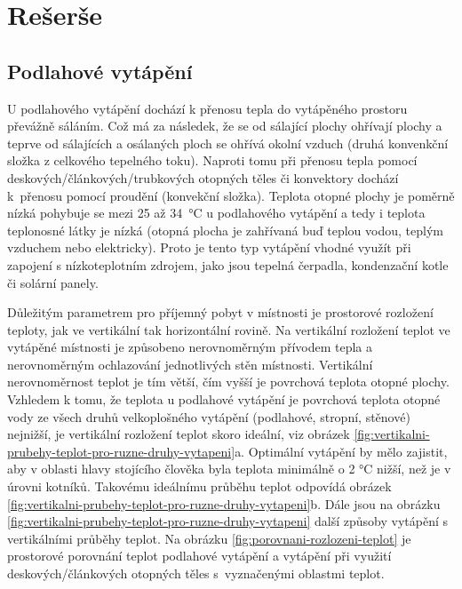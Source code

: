 

\chapter{Rešerše}


\section{Podlahové vytápění}

U podlahového vytápění dochází k přenosu tepla do vytápěného prostoru převážně sáláním. Což má za následek, že se od sálající plochy ohřívají plochy a teprve od sálajících a osálaných ploch se ohřívá okolní vzduch (druhá konvenkční složka z celkového tepelného toku). Naproti tomu při přenosu tepla pomocí deskových/článkových/trubkových otopných těles či konvektory dochází k~přenosu pomocí proudění (konvekční složka). Teplota otopné plochy je poměrně nízká pohybuje se mezi 25 až 34~°C u podlahového vytápění a tedy i teplota teplonosné látky je nízká (otopná plocha je zahřívaná buď teplou vodou, teplým vzduchem nebo elektricky). Proto je tento typ vytápění vhodné využít při zapojení s nízkoteplotním zdrojem, jako jsou tepelná čerpadla, kondenzační kotle či solární panely. \cite{basta-velkoplosne-vytapeni} \cite{valter-regulace-v-praxi}

Důležitým parametrem pro příjemný pobyt v místnosti je prostorové rozložení teploty, jak ve vertikální tak horizontální rovině. Na vertikální rozložení teplot ve vytápěné místnosti je způsobeno nerovnoměrným přívodem tepla a nerovnoměrným ochlazování jednotlivých stěn místnosti. Vertikální nerovnoměrnost teplot je tím větší, čím vyšší je povrchová teplota otopné plochy. Vzhledem k tomu, že teplota u podlahové vytápění je povrchová teplota otopné vody ze všech druhů velkoplošného vytápění (podlahové, stropní, stěnové) nejnižší, je vertikální rozložení teplot skoro ideální, viz obrázek \ref{fig:vertikalni-prubehy-teplot-pro-ruzne-druhy-vytapeni}a. Optimální vytápění by mělo zajistit, aby v oblasti hlavy stojícího člověka byla teplota minimálně o 2 °C nižší, než je v úrovni kotníků. Takovému ideálnímu průběhu teplot odpovídá obrázek \ref{fig:vertikalni-prubehy-teplot-pro-ruzne-druhy-vytapeni}b. Dále jsou na obrázku  \ref{fig:vertikalni-prubehy-teplot-pro-ruzne-druhy-vytapeni} další způsoby vytápění s vertikálními průběhy teplot. Na obrázku \ref{fig:porovnani-rozlozeni-teplot} je prostorové porovnání teplot podlahové vytápění a vytápění při využití deskových/článkových otopných těles s~vyznačenými oblastmi teplot. \cite{basta-velkoplosne-vytapeni} \cite{podlahove-vytapeni-prehled-trhu}


